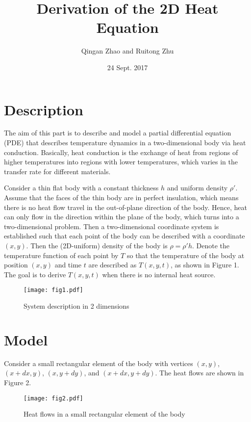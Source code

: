 \documentclass[11pt]{article}
\title{Derivation of the 2D Heat Equation}
\date{24 Sept. 2017}
\author{Qingan Zhao and Ruitong Zhu}
\begin{document}
\maketitle
\newcommand{\ud}{\mathrm d} %
\renewcommand\theequation{\arabic{equation}}
\renewcommand{\figurename}{Fig.}

\section{Description}
The aim of this part is to describe and model a partial differential equation (PDE) that describes temperature dynamics in a two-dimensional body via heat conduction.
Basically, heat conduction is the exchange of heat from regions of higher temperatures into regions with lower temperatures, which varies in the transfer rate for different materials.

Consider a thin flat body with a constant thickness $h$ and uniform density $\rho'$. Assume that the faces of the thin body are in perfect insulation, which means there is no heat flow travel in the out-of-plane direction of the body. Hence, heat can only flow in the direction within the plane of the body, which turns into a two-dimensional problem. Then a two-dimensional coordinate system is established such that each point of the body can be described with a coordinate $(x,y)$. Then the (2D-uniform) density of the body is $\rho = \rho' h$. Denote the temperature function of each point by $T$ so that the temperature of the body at position $(x,y)$ and time $t$ are described as $T(x,y,t)$, as shown in Figure 1. The goal is to derive $T(x,y,t)$ when there is no internal heat source.

\begin{figure}[htb]
	\centering
	\texttt{[image: fig1.pdf]}       
	\caption{System description in 2 dimensions}\label{heatElement.fig}
\end{figure}

\section{Model}
Consider a small rectangular element of the body with vertices $(x,y)$, $(x+dx,y)$, $(x, y+dy)$, and $(x+dx, y+dy)$. The heat flows are shown in Figure 2.
\begin{figure}[htb]
	\centering
	\texttt{[image: fig2.pdf]}       
	\caption{Heat flows in a small rectangular element of the body}
\end{figure}
\end{document}
